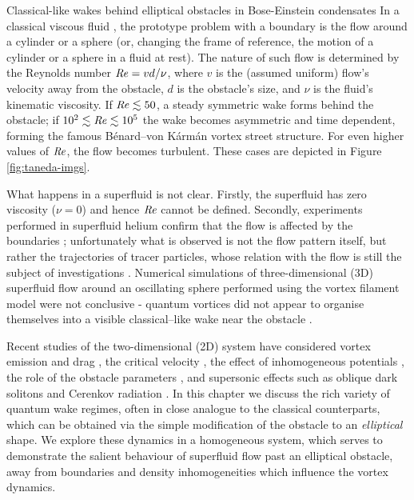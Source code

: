 \begin{chapter}{\label{cha:wake}Classical-like wakes behind elliptical obstacles in Bose-Einstein condensates}
In a classical viscous fluid \cite{Frisch}, the prototype problem with
a boundary is the flow 
around a cylinder or a sphere (or, changing the frame of reference, 
the motion of a cylinder or a sphere in a fluid at rest).
The nature of such flow is determined by the Reynolds 
number $\mbox{\ensuremath{\mathit{Re}}} = vd/\nu$, where $v$ is the (assumed uniform)
flow's velocity away from the obstacle, $d$ is the obstacle's size,
and $\nu$ is the fluid's
kinematic viscosity. If $\mbox{\ensuremath{\mathit{Re}}}\lesssim50$, a steady symmetric 
wake forms behind the obstacle; if $10^2\lesssim\mbox{\ensuremath{\mathit{Re}}}\lesssim10^5$ the wake 
becomes asymmetric and time dependent, forming the famous 
B\'enard--von K\'arm\'an vortex street structure. For even higher values of $\mbox{\ensuremath{\mathit{Re}}}$,
the flow becomes turbulent. These cases are depicted in Figure \ref{fig:taneda-imgs}.

What happens in a superfluid is not clear. Firstly, the superfluid has
zero viscosity ($\nu=0$) and hence $\mbox{\ensuremath{\mathit{Re}}}$ cannot be defined. Secondly,
experiments performed in superfluid helium confirm that the flow is affected
by the boundaries \cite{VanSciver1999,VanSciver2005}; unfortunately 
what is observed is not the flow pattern itself, but rather the
trajectories of tracer particles, whose
relation with the flow is still the subject
of investigations \cite{sergeev09}. Numerical simulations of three-dimensional (3D) superfluid flow around
an oscillating sphere performed using the vortex filament model
were not conclusive - quantum vortices did not appear to organise themselves
into a visible classical--like wake near the obstacle \cite{Hanninen,Fujiyama,goto08}.

Recent studies of the two-dimensional (2D) system have considered vortex emission and drag \cite{nore93,jma99,jma00,win00,huepe00}, the critical velocity \cite{zwerger00,crescimanno00,berloff2000,rica2001,pham2004}, the effect of inhomogeneous potentials \cite{win00,jackson98,fujimoto11}, the role of the obstacle parameters \cite{huepe00,jma00,aioi11}, and supersonic effects such as oblique dark solitons \cite{el06} and Cerenkov radiation \cite{carusotto06}. In this chapter we discuss the rich variety of quantum wake regimes, often in close analogue to the classical counterparts, which can be obtained via the simple modification of the obstacle to an {\it elliptical} shape. We explore these dynamics in a homogeneous system, which serves to demonstrate the salient behaviour of superfluid flow past an elliptical obstacle, away from boundaries and density inhomogeneities which influence the vortex dynamics.


\end{chapter}
